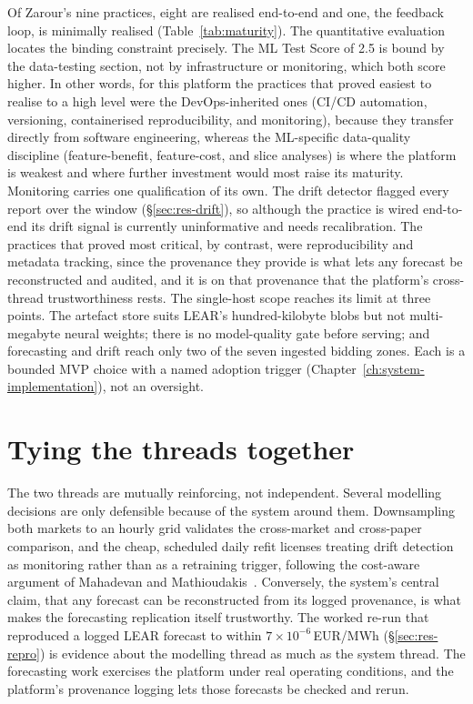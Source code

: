 Of Zarour's nine practices, eight are realised end-to-end and one, the
feedback loop, is minimally realised (Table~\ref{tab:maturity}). The
quantitative evaluation locates the binding constraint precisely. The ML Test
Score of 2.5 is bound by the data-testing section, not by infrastructure or
monitoring, which both score higher. In other words, for this platform the
practices that proved easiest to realise to a high level were the
DevOps-inherited ones (CI/CD automation, versioning, containerised
reproducibility, and monitoring), because they transfer directly from software
engineering, whereas the ML-specific data-quality discipline (feature-benefit,
feature-cost, and slice analyses) is where the platform is weakest and where
further investment would most raise its maturity. Monitoring carries one
qualification of its own. The drift detector flagged every report over the
window (\S\ref{sec:res-drift}), so although the practice is wired end-to-end its
drift signal is currently uninformative and needs recalibration. The practices that proved most
critical, by contrast, were reproducibility and metadata tracking, since the
provenance they provide is what lets any forecast be reconstructed and audited,
and it is on that provenance that the platform's cross-thread trustworthiness
rests. The single-host scope reaches
its limit at three points. The artefact store suits LEAR's hundred-kilobyte
blobs but not multi-megabyte neural weights; there is no model-quality gate
before serving; and forecasting and drift reach only two of the seven ingested
bidding zones. Each is a bounded MVP choice with a named adoption trigger
(Chapter~\ref{ch:system-implementation}), not an oversight.

\section{Tying the threads together}

The two threads are mutually reinforcing, not independent. Several
modelling decisions are only defensible because of the system around them.
Downsampling both markets to an hourly grid validates the cross-market and
cross-paper comparison, and the cheap, scheduled daily refit licenses treating
drift detection as monitoring rather than as a retraining
trigger, following the cost-aware argument of Mahadevan and
Mathioudakis~\cite{mahadevan2024costaware}. Conversely, the system's central
claim, that any forecast can be reconstructed from its logged provenance,
is what makes the forecasting replication itself trustworthy. The worked re-run
that reproduced a logged LEAR forecast to within $7\times10^{-6}$\,EUR/MWh
(\S\ref{sec:res-repro}) is evidence about the modelling thread as much as the
system thread. The forecasting work exercises the platform under real operating
conditions, and the platform's provenance logging lets those forecasts
be checked and rerun.


